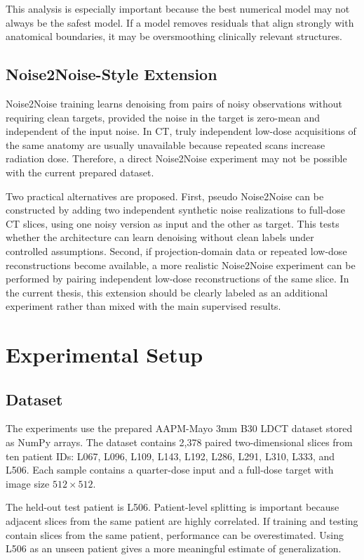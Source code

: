 \documentclass[12pt,a4paper]{report}
\begin{document}
This analysis is especially important because the best numerical model may not always be the safest model. If a model removes residuals that align strongly with anatomical boundaries, it may be oversmoothing clinically relevant structures.

\section{Noise2Noise-Style Extension}

Noise2Noise training learns denoising from pairs of noisy observations without requiring clean targets, provided the noise in the target is zero-mean and independent of the input noise. In CT, truly independent low-dose acquisitions of the same anatomy are usually unavailable because repeated scans increase radiation dose. Therefore, a direct Noise2Noise experiment may not be possible with the current prepared dataset.

Two practical alternatives are proposed. First, pseudo Noise2Noise can be constructed by adding two independent synthetic noise realizations to full-dose CT slices, using one noisy version as input and the other as target. This tests whether the architecture can learn denoising without clean labels under controlled assumptions. Second, if projection-domain data or repeated low-dose reconstructions become available, a more realistic Noise2Noise experiment can be performed by pairing independent low-dose reconstructions of the same slice. In the current thesis, this extension should be clearly labeled as an additional experiment rather than mixed with the main supervised results.

\chapter{Experimental Setup}

\section{Dataset}

The experiments use the prepared AAPM-Mayo 3mm B30 LDCT dataset stored as NumPy arrays. The dataset contains 2,378 paired two-dimensional slices from ten patient IDs: L067, L096, L109, L143, L192, L286, L291, L310, L333, and L506. Each sample contains a quarter-dose input and a full-dose target with image size \(512\times512\).

The held-out test patient is L506. Patient-level splitting is important because adjacent slices from the same patient are highly correlated. If training and testing contain slices from the same patient, performance can be overestimated. Using L506 as an unseen patient gives a more meaningful estimate of generalization.
\end{document}
